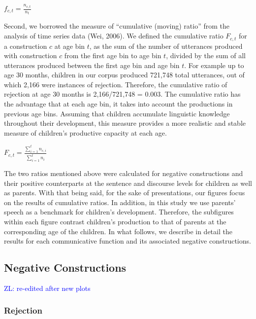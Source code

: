 \documentclass[
  english,
  man,floatsintext]{apa6}
\begin{document}
\(f_{c, t} = \frac{n_{c,t}}{n_{t}}\)

Second, we borrowed the measure of ``cumulative (moving) ratio'' from the analysis of time series data (Wei, 2006). We defined the cumulative ratio \(F_{c,t}\) for a construction \(c\) at age bin \(t\), as the sum of the number of utterances produced with construction \(c\) from the first age bin to age bin \(t\), divided by the sum of all utterances produced between the first age bin and age bin \(t\). For example up to age 30 months, children in our corpus produced 721,748 total utterances, out of which 2,166 were instances of rejection. Therefore, the cumulative ratio of rejection at age 30 months is 2,166/721,748 = 0.003. The cumulative ratio has the advantage that at each age bin, it takes into account the productions in previous age bins. Assuming that children accumulate linguistic knowledge throughout their development, this measure provides a more realistic and stable measure of children's productive capacity at each age.

\(F_{c, t} = \frac{\sum_{i=1}^{t} n_{c,i}}{\sum_{i=1}^{t} n_{i}}\)

The two ratios mentioned above were calculated for negative constructions and their positive counterparts at the sentence and discourse levels for children as well as parents. With that being said, for the sake of presentations, our figures focus on the results of cumulative ratios. In addition, in this study we use parents' speech as a benchmark for children's development. Therefore, the subfigures within each figure contrast children's production to that of parents at the corresponding age of the children. In what follows, we describe in detail the results for each communicative function and its associated negative constructions.

\hypertarget{negative-constructions}{%
\subsection{Negative Constructions}\label{negative-constructions}}

\textcolor{blue}{ZL: re-edited after new plots}

\hypertarget{rejection}{%
\subsubsection{Rejection}\label{rejection}}
\end{document}
